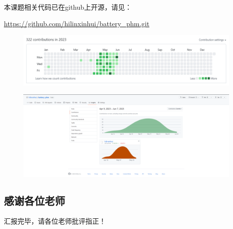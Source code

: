 \documentclass{beamer}
\begin{document}
\begin{frame}
	\centering
	本课题相关代码已在github上开源，请见：

	\centering
	\url {https://github.com/hilinxinhui/battery_phm.git}

	\begin{figure}[htbp]
		\centering
		\includegraphics[scale=0.35]{figures/github_contribution_log.png}
	\end{figure}

	\begin{figure}[htbp]
		\centering
		\includegraphics[scale=0.15]{figures/github_contribution_log_2.png}
	\end{figure}

\end{frame}

\subsection{感谢各位老师}

\begin{frame}
	\LARGE \centering 汇报完毕，请各位老师批评指正！
\end{frame}
\end{document}
